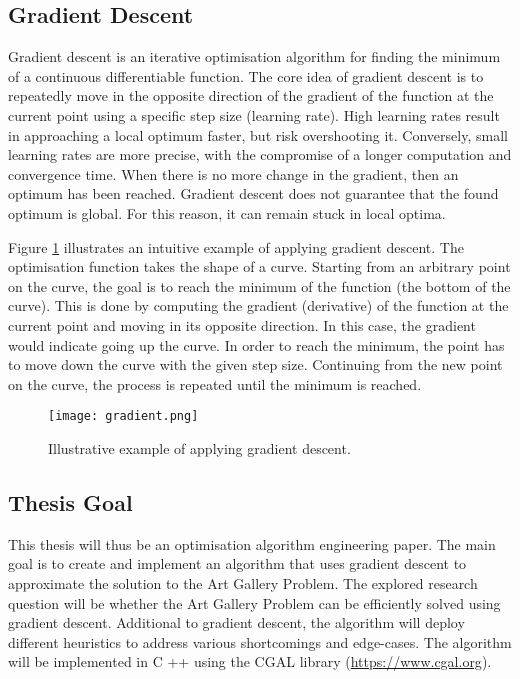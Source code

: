 \newpage
\subsection{Gradient Descent}

Gradient descent is an iterative optimisation algorithm for finding the minimum of a continuous differentiable function. The core idea of gradient descent is to repeatedly move in the opposite direction of the gradient of the function at the current point using a specific step size (learning rate). High learning rates result in approaching a local optimum faster, but risk overshooting it. Conversely, small learning rates are more precise, with the compromise of a longer computation and convergence time.
When there is no more change in the gradient, then an optimum has been reached. Gradient descent does not guarantee that the found optimum is global. For this reason, it can remain stuck in local optima.

Figure \ref{fig:gradient_descent} illustrates an intuitive example of applying gradient descent. The optimisation function takes the shape of a curve. Starting from an arbitrary point on the curve, the goal is to reach the minimum of the function (the bottom of the curve). This is done by computing the gradient (derivative) of the function at the current point and moving in its opposite direction. In this case, the gradient would indicate going up the curve. In order to reach the minimum, the point has to move down the curve with the given step size. Continuing from the new point on the curve, the process is repeated until the minimum is reached.

\begin{figure}[h!]
    \centering
    \texttt{[image: gradient.png]}
    \caption{Illustrative example of applying gradient descent.}
    \label{fig:gradient_descent}
\end{figure}

\subsection{Thesis Goal}
This thesis will thus be an optimisation algorithm engineering paper. The main goal is to create and implement an algorithm that uses gradient descent to approximate the solution to the Art Gallery Problem. The explored research question will be whether the Art Gallery Problem can be efficiently solved using gradient descent. Additional to gradient descent, the algorithm will deploy different heuristics to address various shortcomings and edge-cases.
The algorithm will be implemented in C ++ using the CGAL library (\url{https://www.cgal.org}).

